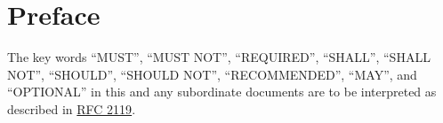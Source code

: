 \documentclass[constitution,final,withoutpreface,withoutoptional,11pt]{../bylaws}
\begin{document}
\frontmatter
\maketitle
\setcounter{tocdepth}{0}
\tableofcontents
\newpage
\mainmatter
\chapter*{Preface}
The key words ``MUST'', ``MUST NOT'', ``REQUIRED'', ``SHALL'', ``SHALL NOT'', ``SHOULD'', ``SHOULD NOT'', ``RECOMMENDED'',  ``MAY'', and ``OPTIONAL'' in this and any subordinate documents are to be interpreted as described in \href{http://www.ietf.org/rfc/rfc2119.txt}{RFC 2119}.








\end{document}
